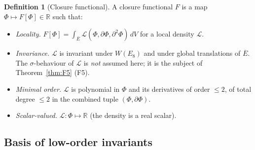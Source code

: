 \documentclass[12pt]{article}
\theoremstyle{definition}
\newtheorem{definition}[theorem]{Definition}
\theoremstyle{remark}
\newcommand{\Lcal}{\mathcal{L}}
\begin{document}
\begin{definition}[Closure functional]\label{def:closure}
A closure functional $F$ is a map $\Phi \mapsto F[\Phi] \in \mathbb{R}$ such that:
\begin{itemize}
\item[\textup{(i)}] \emph{Locality.} $F[\Phi] = \int_{\overline{E}} \Lcal(\Phi, \partial \Phi, \partial^2 \Phi) \, dV$ for a local density $\Lcal$.
\item[\textup{(ii)}] \emph{Invariance.} $\Lcal$ is invariant under $W(E_8)$ and under global translations of $\overline{E}$. The $\sigma$-behaviour of $\Lcal$ is \emph{not} assumed here; it is the subject of Theorem~\ref{thm:F5} (F5).
\item[\textup{(iii)}] \emph{Minimal order.} $\Lcal$ is polynomial in $\Phi$ and its derivatives of order $\le 2$, of total degree $\le 2$ in the combined tuple $(\Phi, \partial \Phi)$.
\item[\textup{(iv)}] \emph{Scalar-valued.} $\Lcal : \Phi \mapsto \mathbb{R}$ (the density is a real scalar).
\end{itemize}
\end{definition}

\subsection{Basis of low-order invariants}\label{sec:F2-basis}
\end{document}
